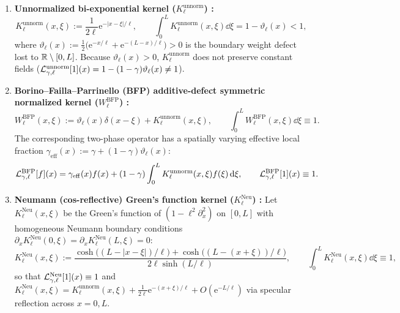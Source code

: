 \begin{enumerate}[leftmargin=*,align=left]
  \item \textbf{Unnormalized bi-exponential kernel ($K_\ell^{\mathrm{unnorm}}$) \cite{FernandezSaez2016,Romano2017,MikhasevNobili2020}:}
  \begin{equation}\label{eq:K_unnorm}
    K_\ell^{\mathrm{unnorm}}(x,\xi) := \frac{1}{2\ell}\mathrm{e}^{-|x-\xi|/\ell}, \qquad
    \int_0^L K_\ell^{\mathrm{unnorm}}(x,\xi)\dd\xi = 1 - \vartheta_\ell(x) < 1,
  \end{equation}
  where $\vartheta_\ell(x) := \frac{1}{2}\big(\mathrm{e}^{-x/\ell} + \mathrm{e}^{-(L-x)/\ell}\big) > 0$ is the boundary weight defect lost to $\mathbb{R} \setminus [0,L]$. Because $\vartheta_\ell(x) > 0$, $K_\ell^{\mathrm{unnorm}}$ does not preserve constant fields ($\mathcal{L}_{\gamma,\ell}^{\mathrm{unnorm}}[1](x) = 1 - (1-\gamma)\vartheta_\ell(x) \neq 1$).

  \item \textbf{Borino--Failla--Parrinello (BFP) additive-defect symmetric normalized kernel ($W_\ell^{\mathrm{BFP}}$) \cite{DiLuzio2005,MarottiDeSciarra2009,BazantLeHoover2010}:}
  \begin{equation}\label{eq:W_BFP}
    W_\ell^{\mathrm{BFP}}(x,\xi) := \vartheta_\ell(x)\delta(x-\xi) + K_\ell^{\mathrm{unnorm}}(x,\xi), \qquad
    \int_0^L W_\ell^{\mathrm{BFP}}(x,\xi)\dd\xi \equiv 1.
  \end{equation}
  The corresponding two-phase operator has a spatially varying effective local fraction $\gamma_{\mathrm{eff}}(x) := \gamma + (1-\gamma)\vartheta_\ell(x)$:
  \begin{equation}\label{eq:L_BFP}
    \mathcal{L}_{\gamma,\ell}^{\mathrm{BFP}}[f](x) = \gamma_{\mathrm{eff}}(x)f(x) + (1-\gamma)\int_0^L K_\ell^{\mathrm{unnorm}}(x,\xi)f(\xi)\,\mathrm{d}\xi, \qquad
    \mathcal{L}_{\gamma,\ell}^{\mathrm{BFP}}[1](x) \equiv 1.
  \end{equation}

  \item \textbf{Neumann (cos-reflective) Green's function kernel ($K_\ell^{\mathrm{Neu}}$) \cite{MarottiDeSciarra2009,BazantLeHoover2010}:} Let $K_\ell^{\mathrm{Neu}}(x,\xi)$ be the Green's function of $(1-\ell^2\partial_x^2)$ on $[0,L]$ with homogeneous Neumann boundary conditions $\partial_x K_\ell^{\mathrm{Neu}}(0,\xi) = \partial_x K_\ell^{\mathrm{Neu}}(L,\xi) = 0$:
  \begin{equation}\label{eq:K_Neu}
    K_\ell^{\mathrm{Neu}}(x,\xi) := \frac{\cosh\!\big((L - |x-\xi|)/\ell\big) + \cosh\!\big((L - (x+\xi))/\ell\big)}{2\ell\sinh(L/\ell)}, \qquad
    \int_0^L K_\ell^{\mathrm{Neu}}(x,\xi)\dd\xi \equiv 1,
  \end{equation}
  so that $\mathcal{L}_{\gamma,\ell}^{\mathrm{Neu}}[1](x) \equiv 1$ and $K_\ell^{\mathrm{Neu}}(x,\xi) = K_\ell^{\mathrm{unnorm}}(x,\xi) + \frac{1}{2\ell}\mathrm{e}^{-(x+\xi)/\ell} + O(\mathrm{e}^{-L/\ell})$ via specular reflection across $x=0,L$.
\end{enumerate}

